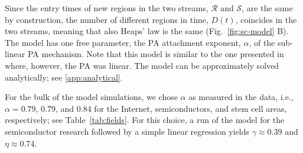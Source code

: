 \documentclass[draft,final]{vutinfth} %
\begin{document}
Since the entry times of new regions in the two streams,  $\mathcal{R}$ and $\mathcal{S}$, are the same by construction, the number of different regions in time, $D(t)$, coincides in the two streams, meaning that also Heaps' law is the same (Fig.~\ref{fig:sc-model} B). The model has one free parameter, the PA attachment exponent, $\alpha$, of the sub-linear PA mechanism. Note that this model is similar to the one presented in \cite{Zanette05} where, however, the PA was linear. The model can be approximately solved analytically; see \ref{app:analytical}.

For the bulk of the model simulations, we chose $\alpha$ as measured in the data, i.e., $\alpha=0.79$, $0.79$, and $0.84$ for the Internet, semiconductors, and stem cell areas, respectively; see Table~\ref{tab:fields}. For this choice, a run of the model for the semiconductor research followed by a simple linear regression yields  $\gamma\approx0.39$ and $\eta\approx0.74$.
\end{document}
